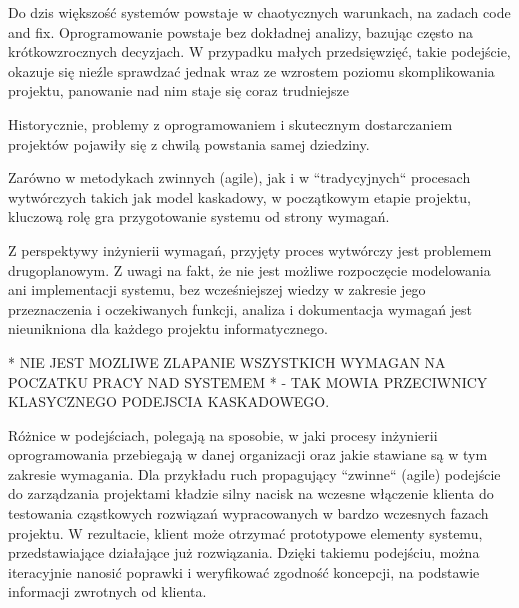       Do dzis większość systemów powstaje w chaotycznych warunkach, na zadach code and fix. Oprogramowanie powstaje bez dokładnej analizy, bazując często na krótkowzrocznych decyzjach. W przypadku małych przedsięwzięć, takie podejście, okazuje się nieźle sprawdzać jednak wraz ze wzrostem poziomu skomplikowania projektu, panowanie nad nim staje się coraz trudniejsze \cite{MFolw05, RWins70}
     
      Historycznie, problemy z oprogramowaniem i skutecznym dostarczaniem projektów pojawiły się z chwilą powstania samej dziedziny. 

      Zarówno w metodykach zwinnych (agile), jak i w ``tradycyjnych`` procesach wytwórczych takich jak model kaskadowy, w początkowym etapie projektu, kluczową rolę gra przygotowanie systemu od strony wymagań. 

      Z perspektywy inżynierii wymagań, przyjęty proces wytwórczy jest problemem drugoplanowym. Z uwagi na fakt, że nie jest możliwe rozpoczęcie modelowania ani implementacji systemu, bez wcześniejszej wiedzy w zakresie jego przeznaczenia i oczekiwanych funkcji, analiza i dokumentacja wymagań jest nieunikniona dla każdego projektu informatycznego. 

      * NIE JEST MOZLIWE ZLAPANIE WSZYSTKICH WYMAGAN NA POCZATKU PRACY NAD SYSTEMEM * - TAK MOWIA PRZECIWNICY KLASYCZNEGO PODEJSCIA KASKADOWEGO.    

      Różnice w podejściach, polegają na sposobie, w jaki procesy inżynierii oprogramowania przebiegają w danej organizacji oraz jakie stawiane są w tym zakresie wymagania. Dla przykładu ruch propagujący ``zwinne`` (agile) podejście do zarządzania projektami kładzie silny nacisk na wczesne włączenie klienta do testowania cząstkowych rozwiązań wypracowanych w bardzo wczesnych fazach projektu. W rezultacie, klient może otrzymać prototypowe elementy systemu, przedstawiające działające już rozwiązania. Dzięki takiemu podejściu, można iteracyjnie nanosić poprawki i weryfikować zgodność koncepcji, na podstawie informacji zwrotnych od klienta. 

